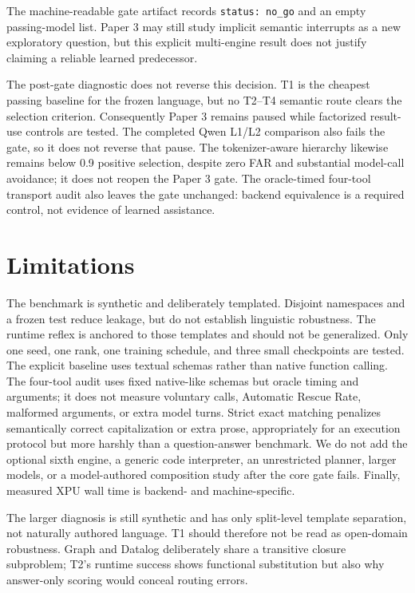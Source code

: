 \documentclass[10pt]{article}
\begin{document}
The machine-readable gate artifact records \texttt{status: no\_go} and an empty
passing-model list.  Paper 3 may still study implicit semantic interrupts as a
new exploratory question, but this explicit multi-engine result does not justify
claiming a reliable learned predecessor.

The post-gate diagnostic does not reverse this decision.  T1 is the cheapest
passing baseline for the frozen language, but no T2--T4 semantic route clears the
selection criterion.  Consequently Paper 3 remains paused while factorized
result-use controls are tested.  The completed Qwen L1/L2 comparison also fails
the gate, so it does not reverse that pause.
The tokenizer-aware hierarchy likewise remains below 0.9 positive selection,
despite zero FAR and substantial model-call avoidance; it does not reopen the
Paper 3 gate.
The oracle-timed four-tool transport audit also leaves the gate unchanged:
backend equivalence is a required control, not evidence of learned assistance.

\section{Limitations}

The benchmark is synthetic and deliberately templated.  Disjoint namespaces and
a frozen test reduce leakage, but do not establish linguistic robustness.  The
runtime reflex is anchored to those templates and should not be generalized.
Only one seed, one rank, one training schedule, and three small checkpoints are
tested.  The explicit baseline uses textual schemas rather than native function
calling. The four-tool audit uses fixed native-like schemas but oracle timing
and arguments; it does not measure voluntary calls, Automatic Rescue Rate,
malformed arguments, or extra model turns. Strict exact matching penalizes semantically correct capitalization or
extra prose, appropriately for an execution protocol but more harshly than a
question-answer benchmark.  We do not add the optional sixth engine, a generic
code interpreter, an unrestricted planner, larger models, or a model-authored
composition study after the core gate fails.  Finally, measured XPU wall time is
backend- and machine-specific.

The larger diagnosis is still synthetic and has only split-level template
separation, not naturally authored language.  T1 should therefore not be read as
open-domain robustness.  Graph and Datalog deliberately share a transitive
closure subproblem; T2's runtime success shows functional substitution but also
why answer-only scoring would conceal routing errors.
\end{document}
